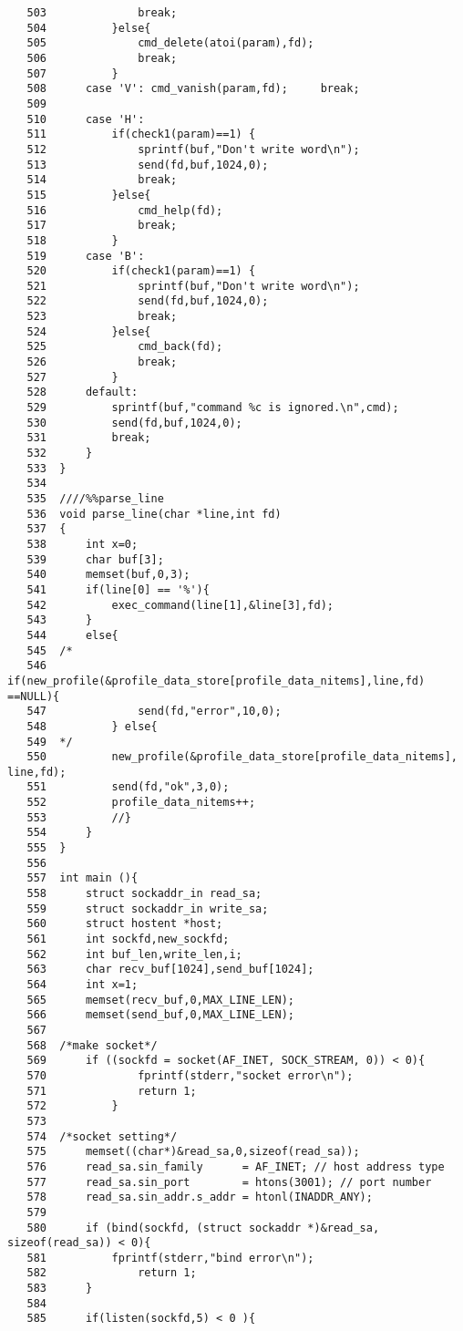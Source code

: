 \documentclass{jarticle}[11pt]
\begin{document}
\begin{verbatim}
   503	            break;
   504	        }else{
   505	            cmd_delete(atoi(param),fd);
   506	            break;
   507	        }
   508	    case 'V': cmd_vanish(param,fd);     break;
   509	        
   510	    case 'H': 
   511	        if(check1(param)==1) {
   512	            sprintf(buf,"Don't write word\n");
   513	            send(fd,buf,1024,0);
   514	            break;
   515	        }else{ 
   516	            cmd_help(fd); 
   517	            break;
   518	        }
   519	    case 'B':
   520	        if(check1(param)==1) {
   521	            sprintf(buf,"Don't write word\n");
   522	            send(fd,buf,1024,0);
   523	            break;
   524	        }else{ 
   525	            cmd_back(fd); 
   526	            break;
   527	        }
   528	    default:
   529	        sprintf(buf,"command %c is ignored.\n",cmd);
   530	        send(fd,buf,1024,0);
   531	        break;
   532	    }
   533	}
   534	
   535	////%%parse_line
   536	void parse_line(char *line,int fd)
   537	{
   538	    int x=0;
   539	    char buf[3];
   540	    memset(buf,0,3);
   541	    if(line[0] == '%'){
   542	        exec_command(line[1],&line[3],fd);
   543	    }
   544	    else{
   545	/*
   546	        if(new_profile(&profile_data_store[profile_data_nitems],line,fd)
==NULL){
   547	            send(fd,"error",10,0);
   548	        } else{
   549	*/
   550	        new_profile(&profile_data_store[profile_data_nitems], line,fd);
   551	        send(fd,"ok",3,0);
   552	        profile_data_nitems++;
   553	        //}
   554	    }
   555	}
   556	
   557	int main (){
   558	    struct sockaddr_in read_sa;
   559	    struct sockaddr_in write_sa;
   560	    struct hostent *host;
   561	    int sockfd,new_sockfd;
   562	    int buf_len,write_len,i;
   563	    char recv_buf[1024],send_buf[1024];
   564	    int x=1;
   565	    memset(recv_buf,0,MAX_LINE_LEN);
   566	    memset(send_buf,0,MAX_LINE_LEN);
   567	
   568	/*make socket*/
   569	    if ((sockfd = socket(AF_INET, SOCK_STREAM, 0)) < 0){
   570	            fprintf(stderr,"socket error\n");
   571	            return 1;
   572	        }
   573	
   574	/*socket setting*/
   575	    memset((char*)&read_sa,0,sizeof(read_sa));
   576	    read_sa.sin_family      = AF_INET; // host address type
   577	    read_sa.sin_port        = htons(3001); // port number
   578	    read_sa.sin_addr.s_addr = htonl(INADDR_ANY);
   579	
   580	    if (bind(sockfd, (struct sockaddr *)&read_sa, sizeof(read_sa)) < 0){
   581	        fprintf(stderr,"bind error\n");
   582	            return 1;
   583	    }
   584	    
   585	    if(listen(sockfd,5) < 0 ){

\end{verbatim}
\end{document}

